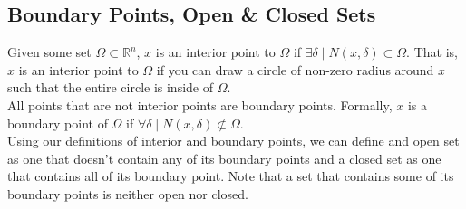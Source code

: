 \subsection{Boundary Points, Open \& Closed Sets}
\noindent
Given some set $\Omega \subset \mathbb{R}^n$, $x$ is an interior point to $\Omega$ if $\exists \delta \mid N(x, \delta) \subset \Omega$. That is, $x$ is an interior point to $\Omega$ if you can draw a circle of non-zero radius around $x$ such that the entire circle is inside of $\Omega$.\\
All points that are not interior points are boundary points. Formally, $x$ is a boundary point of $\Omega$ if $\forall \delta \mid N(x,\delta) \not\subset \Omega$.\\
Using our definitions of interior and boundary points, we can define and open set as one that doesn't contain any of its boundary points and a closed set as one that contains all of its boundary point. Note that a set that contains some of its boundary points is neither open nor closed.